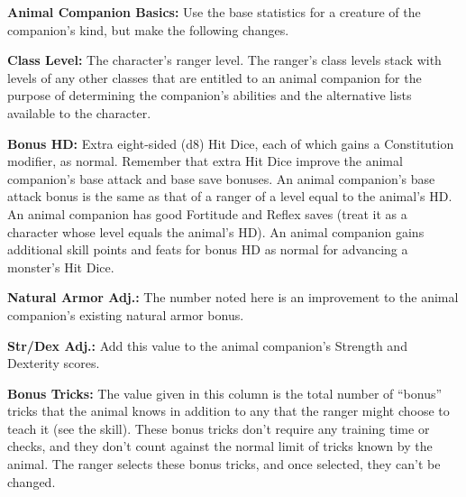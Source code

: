 

\textbf{Animal Companion Basics:} Use the base statistics for a creature of the companion's kind, but make the following changes.

\textbf{Class Level:} The character's ranger level. The ranger's class levels stack with levels of any other classes that are entitled to an animal companion for the purpose of determining the companion's abilities and the alternative lists available to the character.

\textbf{Bonus HD:} Extra eight-sided (d8) Hit Dice, each of which gains a Constitution modifier, as normal. Remember that extra Hit Dice improve the animal companion's base attack and base save bonuses. An animal companion's base attack bonus is the same as that of a ranger of a level equal to the animal's HD. An animal companion has good Fortitude and Reflex saves (treat it as a character whose level equals the animal's HD). An animal companion gains additional skill points and feats for bonus HD as normal for advancing a monster's Hit Dice.

\textbf{Natural Armor Adj.:} The number noted here is an improvement to the animal companion's existing natural armor bonus.

\textbf{Str/Dex Adj.:} Add this value to the animal companion's Strength and Dexterity scores.

\textbf{Bonus Tricks:} The value given in this column is the total number of ``bonus'' tricks that the animal knows in addition to any that the ranger might choose to teach it (see the  skill). These bonus tricks don't require any training time or  checks, and they don't count against the normal limit of tricks known by the animal. The ranger selects these bonus tricks, and once selected, they can't be changed.

